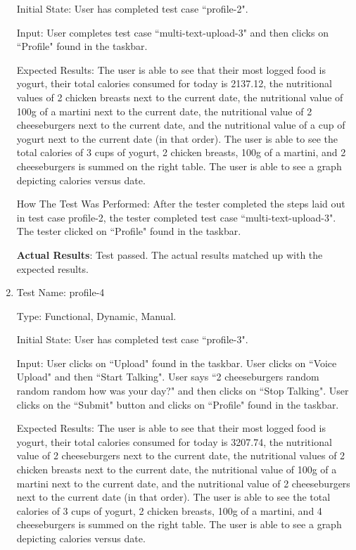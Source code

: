 \documentclass[12pt, titlepage]{article}
\begin{document}
\begin{enumerate}
		Initial State: User has completed test case ``profile-2".
		
		Input: User completes test case ``multi-text-upload-3" and then clicks on ``Profile" found in the taskbar.
		
		Expected Results: The user is able to see that their most logged food is yogurt, their total calories consumed for today is 2137.12, the nutritional values of 2 chicken breasts next to the current date, the nutritional value of 100g of a martini next to the current date, the nutritional value of 2 cheeseburgers next to the current date, and the nutritional value of a cup of yogurt next to the current date (in that order). The user is able to see the total calories of 3 cups of yogurt, 2 chicken breasts, 100g of a martini, and 2 cheeseburgers is summed on the right table. The user is able to see a graph depicting calories versus date.
		
		How The Test Was Performed: After the tester completed the steps laid out in test case profile-2, the tester completed test case ``multi-text-upload-3". The tester clicked on ``Profile" found in the taskbar.
		
		\textbf{Actual Results}: Test passed. The actual results matched up with the expected results.
		
		\item{Test Name: profile-4}
		
		Type: Functional, Dynamic, Manual.
		
		Initial State: User has completed test case ``profile-3".
		
		Input: User clicks on ``Upload" found in the taskbar. User clicks on ``Voice Upload" and then ``Start Talking". User says ``2 cheeseburgers random random random how was your day?" and then clicks on ``Stop Talking". User clicks on the ``Submit" button and clicks on ``Profile" found in the taskbar.
		
		Expected Results: The user is able to see that their most logged food is yogurt, their total calories consumed for today is 3207.74, the nutritional value of 2 cheeseburgers next to the current date, the nutritional values of 2 chicken breasts next to the current date, the nutritional value of 100g of a martini next to the current date, and the nutritional value of 2 cheeseburgers next to the current date (in that order). The user is able to see the total calories of 3 cups of yogurt, 2 chicken breasts, 100g of a martini, and 4 cheeseburgers is summed on the right table. The user is able to see a graph depicting calories versus date.
		

\end{enumerate}
\end{document}
